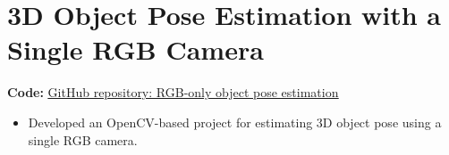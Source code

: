 \documentclass[letterpaper,11pt]{article}
\newcommand{\resumeItem}[1]{
  \item\small{
    {#1 \vspace{-2pt}}
  }
}
\newcommand{\resumeItemListStart}{\begin{itemize}[rightmargin=0.15in]\justifying}
\newcommand{\resumeItemListEnd}{\end{itemize}\vspace{-5pt}}
\begin{document}
\section{3D Object Pose Estimation with a Single RGB Camera}
\noindent\small\textbf{Code:} \href{https://github.com/JinTTTT/3d_obj_pose_estimation_with_only_rgb_camera}{\underline{GitHub repository: RGB-only object pose estimation}}
\resumeItemListStart
    \resumeItem{Developed an OpenCV-based project for estimating 3D object pose using a single RGB camera.}
\resumeItemListEnd
\end{document}

